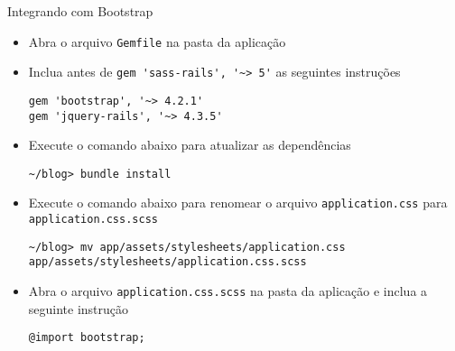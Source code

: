 \begin{frame}{Integrando com Bootstrap}
    \begin{itemize}
      \item Abra o arquivo \verb|Gemfile| na pasta da aplicação
      \item Inclua antes de \verb|gem 'sass-rails', '~> 5'| as seguintes instruções
      \begin{lstlisting}[style=BashInputStyle]
gem 'bootstrap', '~> 4.2.1'
gem 'jquery-rails', '~> 4.3.5'
      \end{lstlisting}
      \item Execute o comando abaixo para atualizar as dependências
      \begin{lstlisting}[style=BashInputStyle]
~/blog> bundle install 
      \end{lstlisting}
      \item Execute o comando abaixo para renomear o arquivo \verb|application.css| para \verb|application.css.scss|
      \begin{lstlisting}[style=BashInputStyle, basicstyle=\tiny\ttfamily]
~/blog> mv app/assets/stylesheets/application.css  app/assets/stylesheets/application.css.scss
      \end{lstlisting}
      \item Abra o arquivo \verb|application.css.scss| na pasta da aplicação e inclua a seguinte instrução
      \begin{lstlisting}[style=RubyInputStyle, basicstyle=\tiny\ttfamily, caption=app/assets/stylesheets/application.css.scss]
@import bootstrap;
      \end{lstlisting}
  \end{itemize}
\end{frame} 